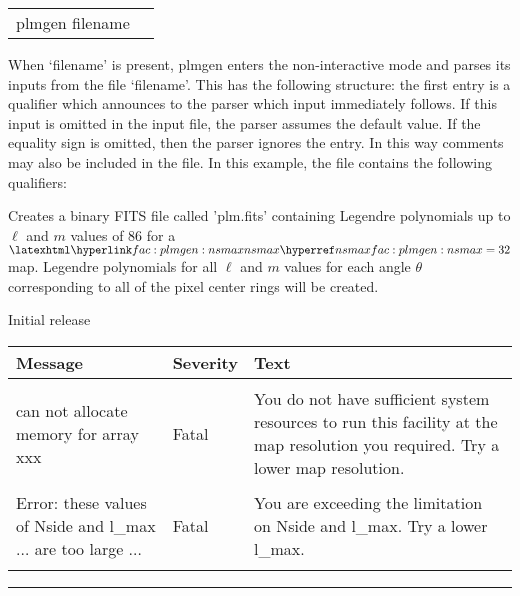 \vfill\newpage

\begin{examples}{2}
{
\begin{tabular}{ll} %
plmgen  filename \\
\end{tabular}
}
{When `filename' is present, plmgen enters the non-interactive mode 
and parses
its inputs from the file `filename'. This has the following
structure: the first entry is a qualifier which announces to the parser
which input immediately follows. If this input is omitted in the
input file, the parser assumes the default value.
If the equality sign is omitted, then the parser ignores the entry.
In this way comments may also be included in the file.
In this example, the file contains the following qualifiers:\hfill\newline
{}
}

Creates a binary FITS file called 'plm.fits' containing Legendre polynomials 
up to $\ell$ and $m$ values of 86 for a $\mylink{fac:plmgen:nsmax}{nsmax}%
=32$ map. 
Legendre polynomials for all $\ell$ and $m$ 
values for each angle $\theta$ corresponding to all of the \healpix
pixel center rings will be 
created.
\end{examples}

\begin{release}
  \begin{relist}
    \item Initial release 
  \end{relist}
\end{release}

\begin{messages}
{
\begin{tabular}{p{0.25\hsize} p{0.1\hsize} p{0.35\hsize}} \hline  
  \textbf{Message} & \textbf{Severity} & \textbf{Text} \\ \hline
                   &                   &   \\ %
can not allocate memory for array xxx &  Fatal & You do not have
                   sufficient system resources to run this
                   facility at the map resolution you required. 
  Try a lower map resolution.  \\ 
                   &                   &   \\ %
Error: these values of Nside and l\_max $\ldots$ are too large $\ldots$ &  Fatal & You are exceeding
the limitation on Nside and l\_max. 
  Try a lower l\_max.  \\ 
                   &                   &   \\ \hline %
\end{tabular}
} 
\end{messages}

\rule{\hsize}{2mm}

\newpage
